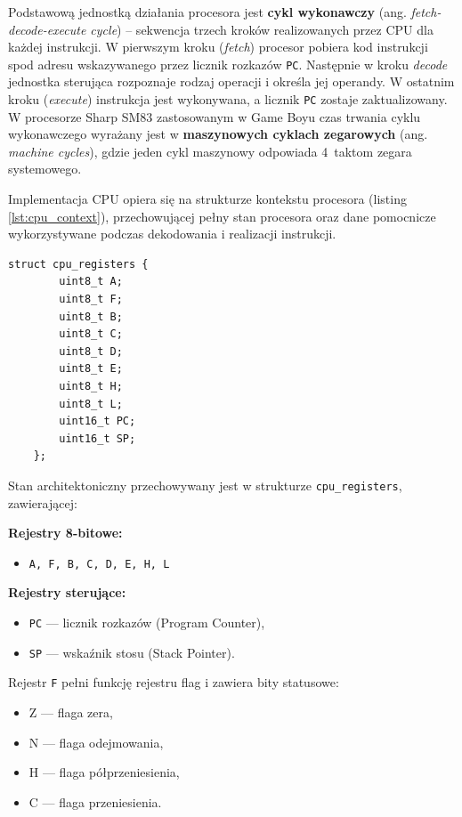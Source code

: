\documentclass{article}
\begin{document}
Podstawową jednostką działania procesora jest \textbf{cykl wykonawczy} (ang.
\textit{fetch-decode-execute cycle}) -- sekwencja trzech kroków realizowanych
przez CPU dla każdej instrukcji. W pierwszym kroku (\textit{fetch}) procesor
pobiera kod instrukcji spod adresu wskazywanego przez licznik rozkazów
\texttt{PC}. Następnie w kroku \textit{decode} jednostka sterująca rozpoznaje
rodzaj operacji i określa jej operandy. W ostatnim kroku (\textit{execute})
instrukcja jest wykonywana, a licznik \texttt{PC} zostaje zaktualizowany.
W procesorze Sharp SM83 zastosowanym w Game Boyu czas trwania cyklu wykonawczego
wyrażany jest w \textbf{maszynowych cyklach zegarowych} (ang. \textit{machine
	cycles}), gdzie jeden cykl maszynowy odpowiada 4~taktom zegara systemowego.

Implementacja CPU opiera się na  strukturze kontekstu procesora (listing \ref{lst:cpu_context}), przechowującej pełny stan procesora oraz dane pomocnicze wykorzystywane podczas dekodowania i realizacji instrukcji.


\begin{lstlisting}[style=cpp,caption={Kontekst wykonania procesora}]
	struct cpu_registers {
    	uint8_t A;
		uint8_t F;
		uint8_t B;
		uint8_t C;
		uint8_t D;
		uint8_t E;
		uint8_t H;
		uint8_t L;
		uint16_t PC;
		uint16_t SP;
	};
\end{lstlisting}


Stan architektoniczny przechowywany jest w strukturze \texttt{cpu\_registers}, zawierającej:

\textbf{Rejestry 8-bitowe:}
\begin{itemize}
	\item \texttt{A, F, B, C, D, E, H, L}
\end{itemize}

\textbf{Rejestry sterujące:}
\begin{itemize}
	\item \texttt{PC} --- licznik rozkazów (Program Counter),
	\item \texttt{SP} --- wskaźnik stosu (Stack Pointer).
\end{itemize}

Rejestr \texttt{F} pełni funkcję rejestru flag i zawiera bity statusowe:
\begin{itemize}
	\item Z --- flaga zera,
	\item N --- flaga odejmowania,
	\item H --- flaga półprzeniesienia,
	\item C --- flaga przeniesienia.
\end{itemize}
\end{document}
